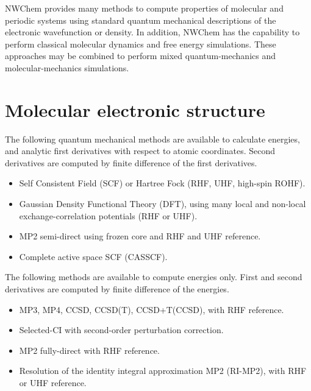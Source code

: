 \label{sec:functionality}

NWChem provides many methods to compute properties of molecular and
periodic systems using standard quantum mechanical descriptions of the
electronic wavefunction or density.  In addition, NWChem has the
capability to perform classical molecular dynamics and free energy
simulations.  These approaches may be combined to perform mixed
quantum-mechanics and molecular-mechanics simulations. 

\section{Molecular electronic structure}

The following quantum mechanical methods are available to calculate
energies, and analytic first derivatives with respect to atomic
coordinates.  Second derivatives are computed by finite difference of
the first derivatives.

\begin{itemize}
\item Self Consistent Field (SCF) or Hartree Fock (RHF, UHF, high-spin
  ROHF).  
\item Gaussian Density Functional Theory (DFT), using many local and
  non-local exchange-correlation potentials (RHF or UHF).
\item MP2 semi-direct using frozen core and RHF and UHF reference.

\item Complete active space SCF (CASSCF).

\end{itemize}

The following methods are available to compute energies only.  First
and second derivatives are computed by finite difference of the
energies.
\begin{itemize}
\item MP3, MP4, CCSD, CCSD(T), CCSD+T(CCSD), with RHF reference.
\item Selected-CI with second-order perturbation correction.
\item MP2 fully-direct with RHF reference.
\item Resolution of the identity integral approximation MP2 (RI-MP2), with
  RHF or UHF reference.
\end{itemize}

